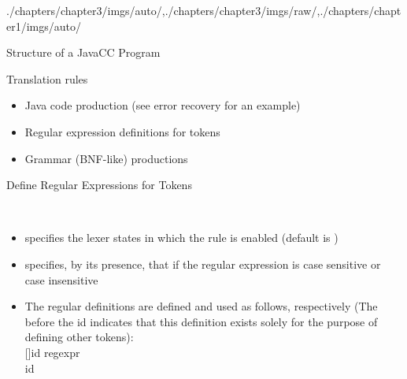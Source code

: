 \begin{graphicspathcontext}{{./chapters/chapter3/imgs/auto/},{./chapters/chapter3/imgs/raw/},{./chapters/chapter1/imgs/auto/}}
\begin{bibunit}[apalike]
\begin{frame}[t,fragile]{Structure of a JavaCC Program}
\begin{small}
{\begin{block}{Translation rules}
		\begin{itemize}
		\item Java code production (see error recovery for an example)
		\item Regular expression definitions for tokens
		\item Grammar (BNF-like) productions
		\end{itemize}
	\end{block}}
	\end{small}
\end{frame}

\begin{frame}{Define Regular Expressions for Tokens}
	\begin{definition}[Tokens]
		 \\
	\end{definition}
	\begin{itemize}
	\item {} specifies the lexer states in which the rule is enabled (default is )
	\item {} specifies, by its presence, that if the regular expression is case sensitive or case insensitive
	\item The regular definitions are defined and used as follows, respectively (The  before the id indicates that this definition exists solely for the purpose of defining other tokens): \\
		\bnfts{\textless} [\bnfts{\#}]id \bnfts{:} regexpr \bnfts{\textgreater} \\
		\bnfts{\textless}id\bnfts{\textgreater}
	\end{itemize}
\end{frame}


\end{bibunit}
\end{graphicspathcontext}

